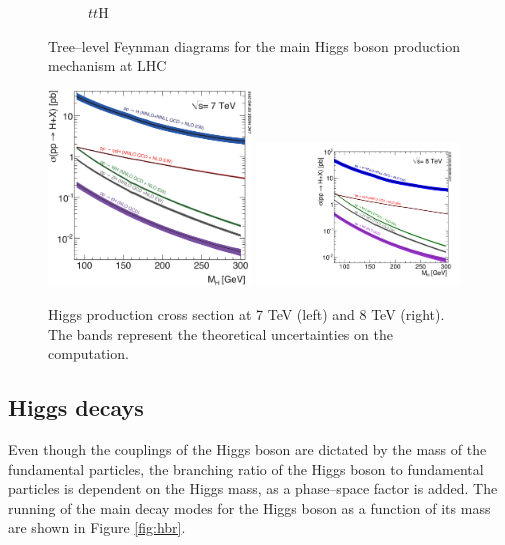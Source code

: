 \begin{figure}
\begin{subfigure}[b]{0.3\textwidth}
                \caption{$tt$H}
                \label{fig:tth}
        \end{subfigure}
        \caption{Tree--level Feynman diagrams for the main Higgs boson production mechanism at LHC}\label{fig:hprod}
\end{figure}

\begin{figure}
        \centering
	\includegraphics[width=0.48\textwidth]{1_Introduction_Th_and_Exp/pics/Higgs_XS_7TeV_LM.eps}
	\includegraphics[width=0.48\textwidth]{1_Introduction_Th_and_Exp/pics/Higgs_XS_8TeV_LM.pdf}
       \caption{Higgs production cross section at 7 TeV (left) and 8 TeV (right). The bands represent the theoretical uncertainties on the computation.}
       \label{fig:hxs}
\end{figure}


\subsection{Higgs decays}

Even though the couplings of the Higgs boson are dictated by the mass of the fundamental particles, the branching ratio of the Higgs boson to fundamental particles is dependent on the Higgs mass, as a phase--space factor is added. The running of the main decay modes for the Higgs boson as a function of its mass are shown in Figure \ref{fig:hbr}. 

